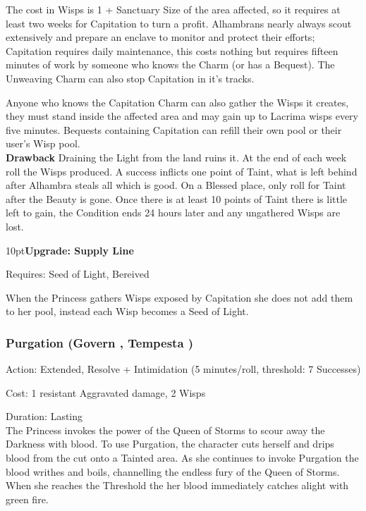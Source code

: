 The cost in Wisps is 1 + Sanctuary Size of the area affected, so it requires at least two weeks for Capitation to turn a profit. Alhambrans nearly always scout extensively and prepare an enclave to monitor and protect their efforts; Capitation requires daily maintenance, this costs nothing but requires fifteen minutes of work by someone who knows the Charm (or has a Bequest). The Unweaving Charm can also stop Capitation in it's tracks. 

Anyone who knows the Capitation Charm can also gather the Wisps it creates, they must stand inside the affected area and may gain up to Lacrima wisps every five minutes. Bequests containing Capitation can refill their own pool or their user's Wisp pool. \\

\noindent \textbf{Drawback} Draining the Light from the land ruins it. At the end of each week roll the Wisps produced. A success inflicts one point of Taint, what is left behind after Alhambra steals all which is good. On a Blessed place, only roll for Taint after the Beauty is gone. Once there is at least 10 points of Taint there is little left to gain, the Condition ends 24 hours later and any ungathered Wisps are lost. 

\begin{myindentpar}{10pt}\textbf{Upgrade: Supply Line}

Requires: Seed of Light, Bereived 

When the Princess gathers Wisps exposed by Capitation she does not add them to her pool, instead each Wisp becomes a Seed of Light.\end{myindentpar}

\subsubsection*{Purgation (Govern \textbullet\textbullet\textbullet, Tempesta \textbullet\textbullet\textbullet\textbullet)}

\noindent Action: Extended, Resolve + Intimidation (5 minutes/roll, threshold: 7 Successes)

\noindent Cost: 1 resistant Aggravated damage, 2 Wisps

\noindent Duration: Lasting \\

\noindent The Princess invokes the power of the Queen of Storms to scour away the Darkness with blood. To use Purgation, the character cuts herself and drips blood from the cut onto a Tainted area. As she continues to invoke Purgation the blood writhes and boils, channelling the endless fury of the Queen of Storms. When she reaches the Threshold the her blood immediately catches alight with green fire. 

